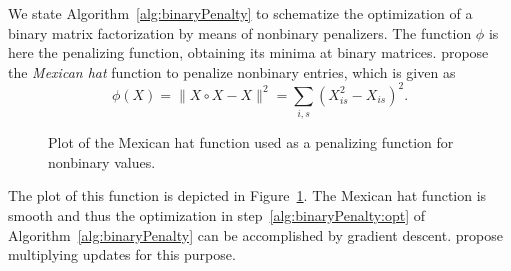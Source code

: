 We state Algorithm~\ref{alg:binaryPenalty} to schematize the optimization of a binary matrix factorization by means of nonbinary penalizers. The function $\phi$ is here the penalizing function, obtaining its minima at binary matrices. \cite{zhang2010binary,zhang2013overlapping} propose the \emph{Mexican hat} function to penalize nonbinary entries, which is given as
\[\phi(X) = \lVert X\circ X-X\rVert ^2 = \sum_{i,s} \left(X_{is}^2-X_{is}\right)^2.\]
\begin{figure}
    \centering
    
    \caption{Plot of the Mexican hat function used as a penalizing function for nonbinary values.}
    \label{fig:mexicanHat}
\end{figure}
The plot of this function is depicted in Figure~\ref{fig:mexicanHat}. The Mexican hat function is smooth and thus the optimization in step~\ref{alg:binaryPenalty:opt} of Algorithm~\ref{alg:binaryPenalty} can be accomplished by gradient descent. \cite{zhang2010binary,zhang2013overlapping} propose multiplying updates for this purpose.